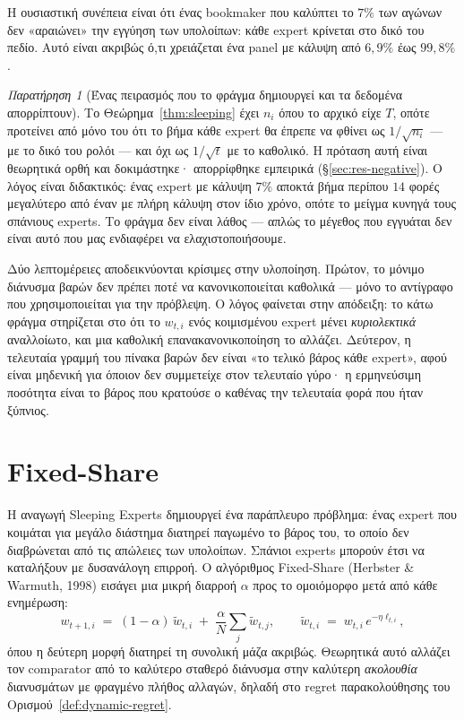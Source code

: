 \documentclass[12pt,a4paper,oneside]{report}
\renewcommand{\_}{\oldunderscore\allowbreak}
\theoremstyle{definition}
\theoremstyle{plain}
\theoremstyle{remark}
\newtheorem{remark}[theorem]{Παρατήρηση}
\begin{document}
Η ουσιαστική συνέπεια είναι ότι ένας bookmaker που καλύπτει το $7\%$ των αγώνων δεν
«αραιώνει» την εγγύηση των υπολοίπων: κάθε expert κρίνεται στο δικό του πεδίο. Αυτό είναι
ακριβώς ό,τι χρειάζεται ένα panel με κάλυψη από $6{,}9\%$ έως $99{,}8\%$.

\begin{remark}[Ένας πειρασμός που το φράγμα δημιουργεί και τα δεδομένα απορρίπτουν]
Το Θεώρημα~\ref{thm:sleeping} έχει $n_i$ όπου το αρχικό είχε $T$, οπότε προτείνει από μόνο
του ότι το βήμα κάθε expert θα έπρεπε να φθίνει ως $1/\sqrt{n_i}$ --- με το δικό του ρολόι
--- και όχι ως $1/\sqrt{t}$ με το καθολικό. Η πρόταση αυτή είναι θεωρητικά ορθή και
δοκιμάστηκε· απορρίφθηκε εμπειρικά (\S\ref{sec:res-negative}). Ο λόγος είναι διδακτικός: ένας
expert με κάλυψη $7\%$ αποκτά βήμα περίπου $14$ φορές μεγαλύτερο από έναν με πλήρη κάλυψη
στον ίδιο χρόνο, οπότε το μείγμα κυνηγά τους σπάνιους experts. Το φράγμα δεν είναι λάθος ---
απλώς το μέγεθος που εγγυάται δεν είναι αυτό που μας ενδιαφέρει να ελαχιστοποιήσουμε.
\end{remark}

Δύο λεπτομέρειες αποδεικνύονται κρίσιμες στην υλοποίηση. Πρώτον, το μόνιμο διάνυσμα βαρών
δεν πρέπει ποτέ να κανονικοποιείται καθολικά --- μόνο το αντίγραφο που χρησιμοποιείται για
την πρόβλεψη. Ο λόγος φαίνεται στην απόδειξη: το κάτω φράγμα στηρίζεται στο ότι το
$w_{t,i}$ ενός κοιμισμένου expert μένει \emph{κυριολεκτικά} αναλλοίωτο, και μια καθολική
επανακανονικοποίηση το αλλάζει. Δεύτερον, η τελευταία γραμμή του πίνακα βαρών δεν είναι «το
τελικό βάρος κάθε expert», αφού είναι μηδενική για όποιον δεν συμμετείχε στον τελευταίο
γύρο· η ερμηνεύσιμη ποσότητα είναι το βάρος που κρατούσε ο καθένας την τελευταία φορά που
ήταν ξύπνιος.

\section{Fixed-Share}
\label{sec:fixed-share}

Η αναγωγή Sleeping Experts δημιουργεί ένα παράπλευρο πρόβλημα: ένας expert που κοιμάται για
μεγάλο διάστημα διατηρεί παγωμένο το βάρος του, το οποίο δεν διαβρώνεται από τις απώλειες
των υπολοίπων. Σπάνιοι experts μπορούν έτσι να καταλήξουν με δυσανάλογη επιρροή. Ο
αλγόριθμος Fixed-Share (Herbster \& Warmuth, 1998) εισάγει μια μικρή διαρροή $\alpha$ προς το
ομοιόμορφο μετά από κάθε ενημέρωση:
\[
w_{t+1,i} \;=\; (1-\alpha)\,\tilde{w}_{t,i} \;+\; \frac{\alpha}{N}\sum_{j} \tilde{w}_{t,j},
\qquad \tilde{w}_{t,i} \;=\; w_{t,i}\,e^{-\eta \ell_{t,i}},
\]
όπου η δεύτερη μορφή διατηρεί τη συνολική μάζα ακριβώς. Θεωρητικά αυτό αλλάζει τον
comparator από το καλύτερο σταθερό διάνυσμα στην καλύτερη \emph{ακολουθία} διανυσμάτων με
φραγμένο πλήθος αλλαγών, δηλαδή στο regret παρακολούθησης του
Ορισμού~\ref{def:dynamic-regret}.
\end{document}

